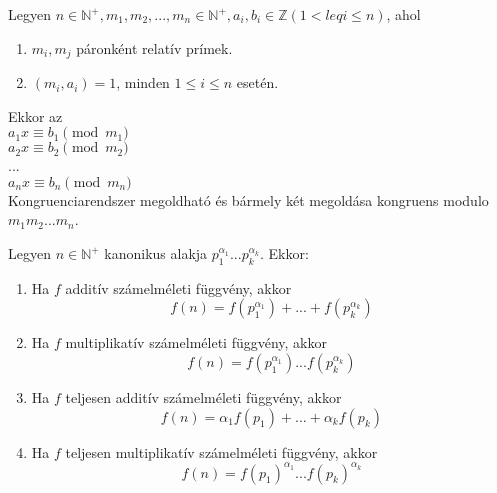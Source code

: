 \begin{frame}
\begin{tcolorbox}[title={Tétel: Kínai maradéktétel}]
Legyen $n \in \mathbb{N}^+, m_1, m_2, ..., m_n \in \mathbb{N}^+, a_i, b_i \in \mathbb{Z} (1 <leq i \leq n)$, ahol
\begin{enumerate}
\item $m_i, m_j$ páronként relatív prímek.
\item $(m_i, a_i) = 1$, minden $1 \leq i \leq n$ esetén.
\end{enumerate}
Ekkor az\\
\bigskip
	$a_1x \equiv b_1 \pmod{m_1}$\\
	$a_2x \equiv b_2 \pmod{m_2}$\\
	...\\
	$a_nx \equiv b_n \pmod{m_n}$\\
\bigskip
Kongruenciarendszer megoldható és bármely két megoldása kongruens modulo $m_1m_2...m_n$.
\end{tcolorbox}

\begin{tcolorbox}[title={Def.: A kínai maradéktétel megoldása}]
\end{tcolorbox}
\end{frame}

\begin{frame}

\begin{tcolorbox}[title={Def.: A számelméleti függvények}]
\end{tcolorbox}
\begin{tcolorbox}[title={Tétel: Számelméleti függvények}]
Legyen $n \in \mathbb{N}^+$ kanonikus alakja $p_1^{{\alpha}_1}...p_k^{{\alpha}_k}$. Ekkor:\\
\begin{enumerate}
\item Ha $f$ additív számelméleti függvény, akkor $$f(n) = f(p_1^{{\alpha}_1}) + ... + f(p_k^{{\alpha}_k})$$
\item Ha $f$ multiplikatív számelméleti függvény, akkor $$f(n) = f(p_1^{{\alpha}_1})...f(p_k^{{\alpha}_k})$$
\item Ha $f$ teljesen additív számelméleti függvény, akkor $$f(n) = {\alpha}_1f(p_1) + ... + {\alpha}_kf(p_k)$$
\item Ha $f$ teljesen multiplikatív számelméleti függvény, akkor $$f(n) = f(p_1)^{{\alpha}_1}...f(p_k)^{{\alpha}_k}$$
\end{enumerate}
\end{tcolorbox}
\end{frame}

